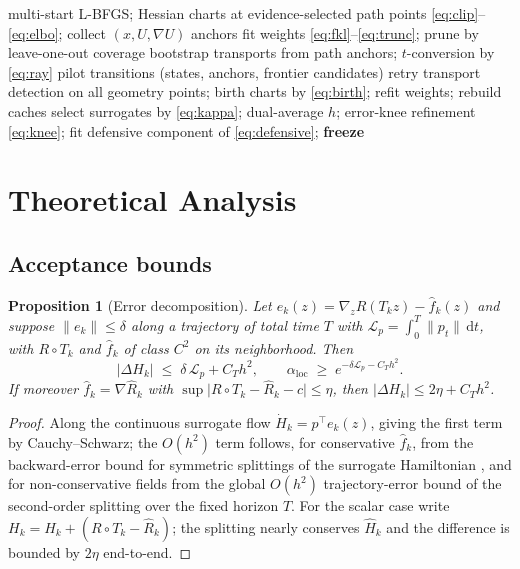 \documentclass[11pt]{article}
\newtheorem{proposition}{Proposition}
\theoremstyle{remark}
\newcommand{\dd}{\mathrm{d}}
\begin{document}
\begin{algorithm}[t]
\caption{Warm-up (all adaptation frozen before production)}
\label{alg:warm}
\begin{algorithmic}[1]
\State multi-start L-BFGS; Hessian charts at evidence-selected path
  points \eqref{eq:clip}--\eqref{eq:elbo}; collect
  $(x,U,\nabla U)$ anchors
\State fit weights \eqref{eq:fkl}--\eqref{eq:trunc}; prune by
  leave-one-out coverage
\State bootstrap transports from path anchors; $t$-conversion by
  \eqref{eq:ray}
  \State pilot transitions (states, anchors, frontier candidates)
  \State retry transport detection on all geometry points; birth charts
    by \eqref{eq:birth}; refit weights; rebuild caches
\EndFor
\State select surrogates by \eqref{eq:kappa}; dual-average $h$;
  error-knee refinement \eqref{eq:knee}; fit defensive component of
  \eqref{eq:defensive}; \textbf{freeze}
\end{algorithmic}
\end{algorithm}

\section{Theoretical Analysis}\label{sec:theory}
\subsection{Acceptance bounds}
\begin{proposition}[Error decomposition]\label{prop:accept}
Let $e_k(z)=\nabla_zR(T_kz)-\hat f_k(z)$ and suppose
$\lVert e_k\rVert\le\delta$ along a trajectory of total time $T$ with
$\mathcal L_p=\int_0^T\lVert p_t\rVert\,\dd t$, with $R\circ T_k$ and
$\hat f_k$ of class $C^2$ on its neighborhood. Then
\begin{equation}
\lvert\Delta H_k\rvert\;\le\;\delta\,\mathcal L_p+C_Th^2,
\qquad
\alpha_{\mathrm{loc}}\;\ge\;e^{-\delta\mathcal L_p-C_Th^2}.
\label{eq:accbound}
\end{equation}
If moreover $\hat f_k=\nabla\widehat R_k$ with
$\sup\lvert R\circ T_k-\widehat R_k-c\rvert\le\eta$, then
$\lvert\Delta H_k\rvert\le2\eta+C_Th^2$.
\end{proposition}
\begin{proof}
Along the continuous surrogate flow $\dot H_k=p^\top e_k(z)$, giving the
first term by Cauchy--Schwarz; the $O(h^2)$ term follows, for conservative $\hat f_k$, from the
backward-error bound for symmetric splittings of the surrogate
Hamiltonian \citep{leimkuhler2004}, and for non-conservative fields
from the global $O(h^2)$ trajectory-error bound of the second-order
splitting over the fixed horizon $T$. For the scalar case write
$H_k=\widehat H_k+(R\circ T_k-\widehat R_k)$; the splitting nearly
conserves $\widehat H_k$ and the difference is bounded by $2\eta$
end-to-end.
\end{proof}
\end{document}
